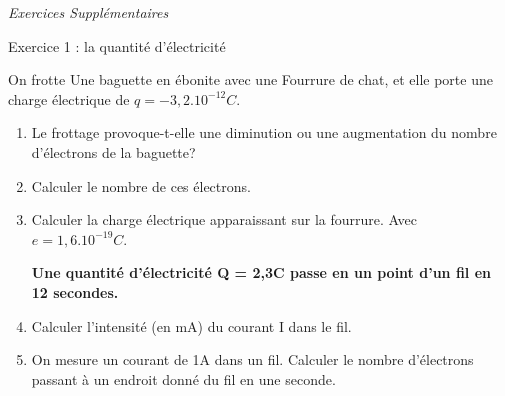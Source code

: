 \documentclass[12pt, french]{article}
\begin{document}
\begin{center}
\end{center}
\begin{center}
   \Large{ \em{Exercices Supplémentaires}}
\end{center}

   \begin{Box2}{Exercice 1 : la quantité d'électricité  }


On frotte Une baguette en ébonite avec une Fourrure de chat, et elle porte une charge électrique de
$q=-3,2.10^{-12}C$.

\begin{enumerate}
	\item  Le frottage provoque-t-elle une diminution ou une augmentation du nombre d'électrons de la
baguette?
\item Calculer le nombre de ces électrons.
\item  Calculer la charge électrique apparaissant sur la fourrure.      Avec $e =1,6.10^{-19}C$.

	\textbf{Une quantité d'électricité Q = 2,3C passe en un point d'un fil en 12 secondes.}
\item Calculer l'intensité (en mA) du courant I dans le fil.
\item  On mesure un courant de 1A dans un fil. Calculer le nombre d'électrons passant à un endroit donné
du fil en une seconde.
\end{enumerate}
   \end{Box2}
\end{document}

